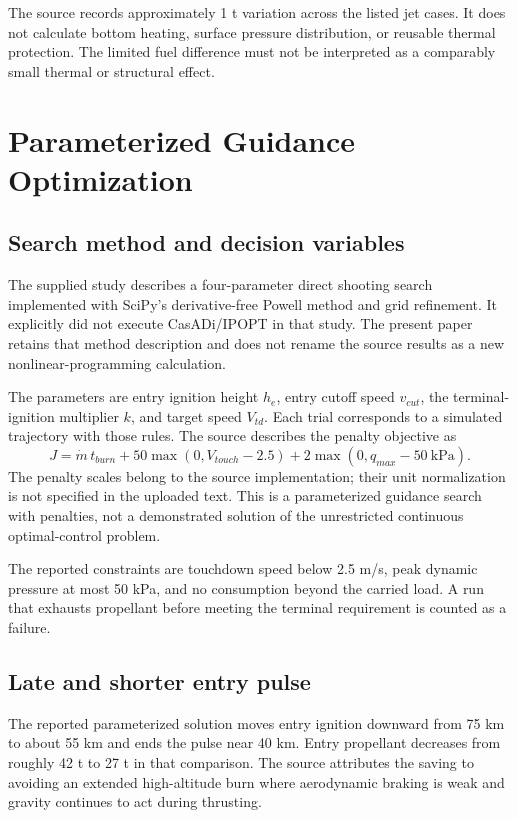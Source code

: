 \documentclass[11pt,a4paper]{article}
\begin{document}



The source records approximately 1 t variation across the listed jet cases. It does not calculate bottom heating, surface pressure distribution, or reusable thermal protection. The limited fuel difference must not be interpreted as a comparably small thermal or structural effect.

\section{Parameterized Guidance Optimization}
\subsection{Search method and decision variables}
The supplied study describes a four-parameter direct shooting search implemented with SciPy's derivative-free Powell method and grid refinement. It explicitly did not execute CasADi/IPOPT in that study. The present paper retains that method description and does not rename the source results as a new nonlinear-programming calculation.



The parameters are entry ignition height $h_e$, entry cutoff speed $v_{cut}$, the terminal-ignition multiplier $k$, and target speed $V_{td}$. Each trial corresponds to a simulated trajectory with those rules. The source describes the penalty objective as
\begin{equation}
 J=\dot m\,t_{burn}
 +50\max(0,V_{touch}-2.5)
 +2\max(0,q_{max}-50\ \mathrm{kPa}).
\label{eq:objective}
\end{equation}
The penalty scales belong to the source implementation; their unit normalization is not specified in the uploaded text. This is a parameterized guidance search with penalties, not a demonstrated solution of the unrestricted continuous optimal-control problem.

The reported constraints are touchdown speed below 2.5 m/s, peak dynamic pressure at most 50 kPa, and no consumption beyond the carried load. A run that exhausts propellant before meeting the terminal requirement is counted as a failure.

\subsection{Late and shorter entry pulse}


The reported parameterized solution moves entry ignition downward from 75 km to about 55 km and ends the pulse near 40 km. Entry propellant decreases from roughly 42 t to 27 t in that comparison. The source attributes the saving to avoiding an extended high-altitude burn where aerodynamic braking is weak and gravity continues to act during thrusting.
\end{document}

